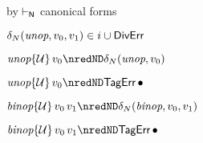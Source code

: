 {\begin{lamportproof*}
    \begin{pfproof}
        \begin{pfproof}
          by $\vdash_{\mathsf{N}}$ canonical forms
        \end{pfproof}
      \qedstep
        \begin{pfproof}
          $\delta_{N}(\textit{unop}, v_0, v_1) \in i \cup \mathsf{DivErr}$
        \end{pfproof}
    \end{pfproof}

    \begin{pfproof}
        \begin{pfproof}
          \qedstep
            \begin{pfproof}
              $\eunopt{\tdyn}{\svalue_0} \nredND \sdeltaH(\sunop, \svalue_0)$
            \end{pfproof}
        \end{pfproof}
        \begin{pfproof}
          \qedstep
            \begin{pfproof}
              $\eunopt{\tdyn}{\svalue_0} \nredND \tagerrorD$
            \end{pfproof}
        \end{pfproof}
    \end{pfproof}

    \begin{pfproof}
        \begin{pfproof}
          \qedstep
            \begin{pfproof}
              $\ebinopt{\tdyn}{\svalue_0}{\svalue_1} \nredND \sdeltaH(\sbinop, \svalue_0, \svalue_1)$
            \end{pfproof}
        \end{pfproof}
        \begin{pfproof}
          \qedstep
            \begin{pfproof}
              $\ebinopt{\tdyn}{\svalue_0}{\svalue_1} \nredND \tagerrorD$
            \end{pfproof}
        \end{pfproof}
    \end{pfproof}

\end{lamportproof*}}

